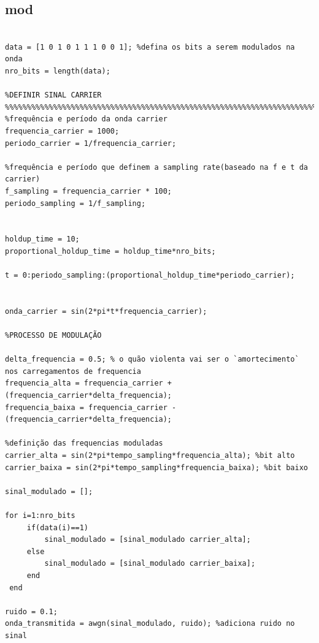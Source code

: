 \documentclass[10pt,a4paper]{report}
\begin{document}
\subsection{mod}
	\begin{verbatim}

data = [1 0 1 0 1 1 1 0 0 1]; %defina os bits a serem modulados na onda
nro_bits = length(data);

%DEFINIR SINAL CARRIER
%%%%%%%%%%%%%%%%%%%%%%%%%%%%%%%%%%%%%%%%%%%%%%%%%%%%%%%%%%%%%%%%%%%%%%%%%%%%%%
%frequência e período da onda carrier
frequencia_carrier = 1000; 
periodo_carrier = 1/frequencia_carrier;

%frequência e período que definem a sampling rate(baseado na f e t da carrier)
f_sampling = frequencia_carrier * 100;
periodo_sampling = 1/f_sampling;


holdup_time = 10;
proportional_holdup_time = holdup_time*nro_bits;

t = 0:periodo_sampling:(proportional_holdup_time*periodo_carrier);


onda_carrier = sin(2*pi*t*frequencia_carrier); 

%PROCESSO DE MODULAÇÃO

delta_frequencia = 0.5; % o quão violenta vai ser o `amortecimento` nos carregamentos de frequencia
frequencia_alta = frequencia_carrier + (frequencia_carrier*delta_frequencia);
frequencia_baixa = frequencia_carrier - (frequencia_carrier*delta_frequencia);

%definição das frequencias moduladas
carrier_alta = sin(2*pi*tempo_sampling*frequencia_alta); %bit alto
carrier_baixa = sin(2*pi*tempo_sampling*frequencia_baixa); %bit baixo

sinal_modulado = [];

for i=1:nro_bits
     if(data(i)==1)
         sinal_modulado = [sinal_modulado carrier_alta];
     else
         sinal_modulado = [sinal_modulado carrier_baixa];
     end
 end

ruido = 0.1;
onda_transmitida = awgn(sinal_modulado, ruido); %adiciona ruido no sinal
\end{verbatim}

	
\end{document}
